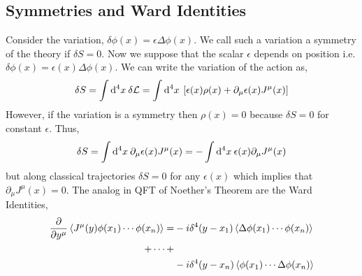 \documentclass[12pt]{extarticle}
\begin{document}
\subsection{Symmetries and Ward Identities}

Consider the variation, $\delta \phi(x) = \epsilon \Delta \phi(x)$. We call such a variation a symmetry of the theory if $\delta S = 0$. Now we suppose that the scalar $\epsilon$ depends on position i.e. $\delta \phi(x) = \epsilon(x) \Delta \phi(x)$. We can write the variation of the action as,
\[ \delta S = \int \mathrm{d}^{4} x \: \delta \mathcal{L} = \int \mathrm{d}^{4} x \: \left[ \epsilon(x) \rho(x) + \partial_\mu \epsilon(x) J^\mu(x) \right] \]
However, if the variation is a symmetry then $\rho(x) = 0$ because $\delta S = 0$ for constant $\epsilon$. Thus,
\begin{align*}
\delta S =  \int \mathrm{d}^{4} x \: \partial_\mu \epsilon(x) J^\mu(x) = - \int \mathrm{d}^{4} x \: \epsilon(x) \partial_\mu J^\mu(x)
\end{align*}
but along classical trajectories $\delta S = 0$ for any $\epsilon(x)$ which implies that $\partial_\mu J^\mu(x) = 0$. 
The analog in QFT of Noether's Theorem are the Ward Identities,
\begin{align*}
\frac{\partial{}}{\partial{y^\mu}} \left<  J^\mu(y) \phi(x_1) \cdots \phi(x_n)  \right>  = & - i \delta^4(y - x_1) \left< \Delta \phi(x_1) \cdots \phi(x_n)  \right> 
\\
+ \cdots + 
& 
\\
& - i \delta^4(y - x_n) \left< \phi(x_1) \cdots \Delta \phi(x_n)  \right> 
\end{align*}
\end{document}

